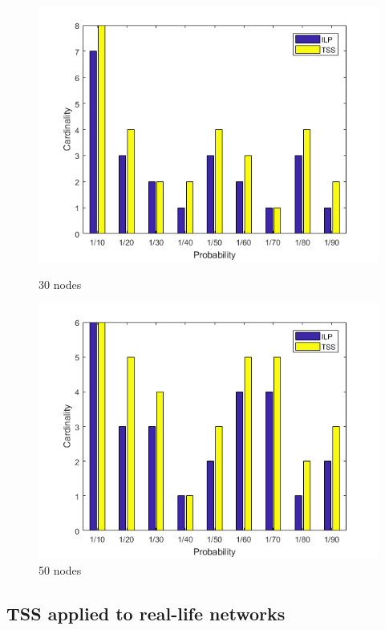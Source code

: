 \begin{figure}[h!]
\begin{minipage}[t]{0.50\textwidth}
\includegraphics[width=\linewidth,keepaspectratio=true]{images/rand30result.png}
\caption{30 nodes}

\end{minipage}
\begin{minipage}[t]{0.50\textwidth}
\includegraphics[width=\linewidth,keepaspectratio=true]{images/rand50result.png}
\caption{50 nodes}
\end{minipage}
\end{figure}

\subsection{TSS applied to real-life networks}

